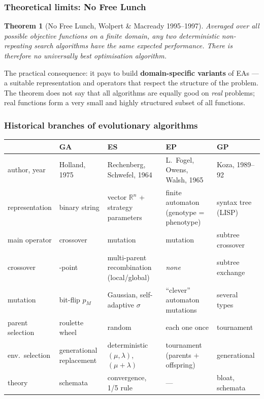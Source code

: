 \documentclass[11pt,a4paper]{article}
\newtheorem{theorem}{Theorem}[section]
\theoremstyle{definition}
\providecommand{\uv}[1]{``#1''}
\begin{document}
\subsubsection{Theoretical limits: No Free Lunch}

\begin{theorem}[No Free Lunch, Wolpert \& Macready 1995--1997]
Averaged over \emph{all} possible objective functions on a finite domain, any
two deterministic non-repeating search algorithms have the same expected
performance. There is therefore no universally best optimisation algorithm.
\end{theorem}

The practical consequence: it pays to build \textbf{domain-specific variants} of EAs ---
a suitable representation and operators that respect the structure of the problem. The
theorem does not say that all algorithms are equally good on \emph{real} problems; real
functions form a very small and highly structured subset of all functions.

\subsubsection{Historical branches of evolutionary algorithms}

\begin{center}
\small
\begin{tabular}{@{}>{\raggedright\arraybackslash}p{2.3cm}
                  >{\raggedright\arraybackslash}p{3.1cm}
                  >{\raggedright\arraybackslash}p{3.1cm}
                  >{\raggedright\arraybackslash}p{3.1cm}
                  >{\raggedright\arraybackslash}p{3.1cm}@{}}
\toprule
 & \textbf{GA} & \textbf{ES} & \textbf{EP} & \textbf{GP} \\
\midrule
author, year & Holland, 1975 & Rechenberg, Schwefel, 1964 &
  L.~Fogel, Owens, Walsh, 1965 & Koza, 1989--92 \\[2pt]
representation & binary string & vector $\mathbb{R}^n$ + strategy parameters &
  finite automaton (genotype = phenotype) & syntax tree (LISP) \\[2pt]
main operator & crossover & mutation & mutation & subtree crossover \\[2pt]
crossover & 1-point & multi-parent recombination (local/global) &
  \emph{none} & subtree exchange \\[2pt]
mutation & bit-flip $p_M$ & Gaussian, self-adaptive $\sigma$ &
  \uv{clever} automaton mutations & several types \\[2pt]
parent selection & roulette wheel & random & each one once & tournament \\[2pt]
env.\ selection & generational replacement &
  deterministic $(\mu,\lambda)$, $(\mu+\lambda)$ &
  tournament (parents $+$ offspring) & generational \\[2pt]
theory & schemata & convergence, 1/5 rule & --- & bloat, schemata \\
\bottomrule
\end{tabular}
\end{center}
\end{document}
